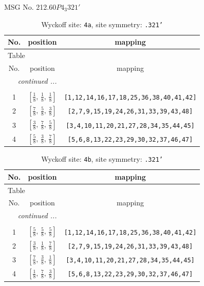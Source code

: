 \documentclass[fleqn,8pt]{jsarticle}
\begin{document}
\setcounter{MaxMatrixCols}{32}

\renewcommand{\tablename}{Table~}
\renewcommand{\figurename}{Figure~}
\begin{center}
\LARGE
MSG No. 212.60\quad$P4_{3}321'$
\end{center}
\renewcommand{\arraystretch}{1.2}
\begin{longtable}{ccc}
\caption{Wyckoff site: {\tt 4a}, site symmetry: {\tt .321'}}
 \\
 \hline \hline
No. & position & mapping \\ \hline \endfirsthead

\multicolumn{2}{l}{\tablename\ \thetable{}} \\
 \hline \hline
No. & position & mapping \\ \hline \endhead

 \hline \hline
\multicolumn{2}{r}{\footnotesize\it continued ...} \\ \endfoot

 \hline \hline
\multicolumn{2}{r}{} \\ \endlastfoot

1 & $\left[ \frac{1}{8},\, \frac{1}{8},\, \frac{1}{8} \right]$ & {\tt [1,12,14,16,17,18,25,36,38,40,41,42]} \\ \hline
2 & $\left[ \frac{7}{8},\, \frac{5}{8},\, \frac{3}{8} \right]$ & {\tt [2,7,9,15,19,24,26,31,33,39,43,48]} \\ \hline
3 & $\left[ \frac{3}{8},\, \frac{7}{8},\, \frac{5}{8} \right]$ & {\tt [3,4,10,11,20,21,27,28,34,35,44,45]} \\ \hline
4 & $\left[ \frac{5}{8},\, \frac{3}{8},\, \frac{7}{8} \right]$ & {\tt [5,6,8,13,22,23,29,30,32,37,46,47]} \\
\end{longtable}
\renewcommand{\arraystretch}{1.2}
\begin{longtable}{ccc}
\caption{Wyckoff site: {\tt 4b}, site symmetry: {\tt .321'}}
 \\
 \hline \hline
No. & position & mapping \\ \hline \endfirsthead

\multicolumn{2}{l}{\tablename\ \thetable{}} \\
 \hline \hline
No. & position & mapping \\ \hline \endhead

 \hline \hline
\multicolumn{2}{r}{\footnotesize\it continued ...} \\ \endfoot

 \hline \hline
\multicolumn{2}{r}{} \\ \endlastfoot

1 & $\left[ \frac{5}{8},\, \frac{5}{8},\, \frac{5}{8} \right]$ & {\tt [1,12,14,16,17,18,25,36,38,40,41,42]} \\ \hline
2 & $\left[ \frac{3}{8},\, \frac{1}{8},\, \frac{7}{8} \right]$ & {\tt [2,7,9,15,19,24,26,31,33,39,43,48]} \\ \hline
3 & $\left[ \frac{7}{8},\, \frac{3}{8},\, \frac{1}{8} \right]$ & {\tt [3,4,10,11,20,21,27,28,34,35,44,45]} \\ \hline
4 & $\left[ \frac{1}{8},\, \frac{7}{8},\, \frac{3}{8} \right]$ & {\tt [5,6,8,13,22,23,29,30,32,37,46,47]} \\
\end{longtable}
\end{document}
